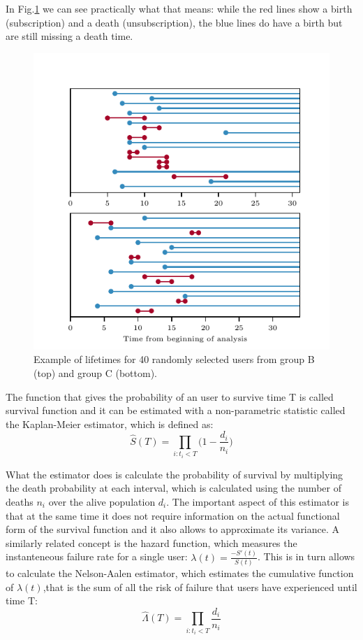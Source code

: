 \documentclass[paper=a4, fontsize=11pt]{report}
\begin{document}
In Fig.\ref{fig:lifetimes} we can see practically what that means: while the red lines show a birth (subscription)
and a death (unsubscription), the blue lines do have a birth but are still missing a death time.
\begin{figure}[htpb!]
\centering
\includegraphics[width=.99\columnwidth]{lifetime.pdf}
\caption{Example of lifetimes for 40 randomly selected users from group B (top) and group C (bottom).}
\label{fig:lifetimes}
\end{figure}

The function that gives the probability of an user to survive time T is called survival function and it can be estimated
with a non-parametric statistic called the Kaplan-Meier estimator, which is defined as:
\begin{equation}
 \hat{S}(T) = \prod_{i: t_{i} < T} \Big(1 - \frac{d_{i}}{n_{i}} \Big)
\end{equation}


What the estimator does is calculate the probability of survival by multiplying the death probability at each interval, which
is calculated using the number of deaths $n_{i}$ over the alive population $d_{i}$. The important aspect of this 
estimator is that at the same time it does not require information on the actual functional form of the survival function
and it also allows to approximate its variance. A similarly related concept is the hazard function, which measures
the instanteneous failure rate for a single user: $ \lambda (t) = \frac{-S'(t)}{S(t)}
$. This is in turn allows to calculate the Nelson-Aalen estimator, which estimates the cumulative function of $\lambda(t)$,that
is the sum of all the risk of failure that users have experienced until time T:
\begin{equation}
 \hat{\Lambda}(T) = \prod_{i: t_{i} < T}  \frac{d_{i}}{n_{i}}
\end{equation}
\end{document}
